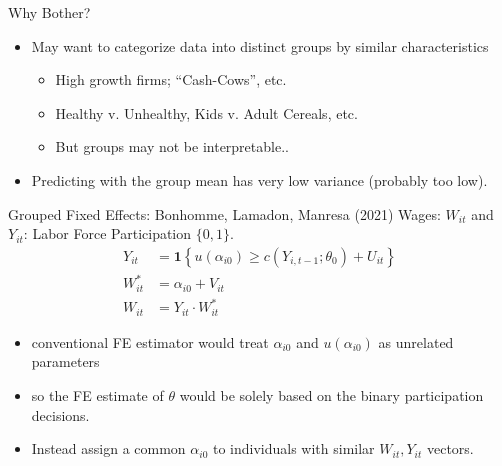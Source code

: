 \documentclass[xcolor=pdftex,dvipsnames,table,mathserif,aspectratio=169]{beamer}
\begin{document}
\begin{frame}{Why Bother?}
\begin{itemize}
\item May want to categorize data into distinct groups by similar characteristics
\begin{itemize}
\item High growth firms; ``Cash-Cows'', etc.
\item Healthy v. Unhealthy, Kids v. Adult Cereals, etc.
\item But groups may not be interpretable..
\end{itemize}
\item Predicting with the group mean has very low variance (probably too low).
\end{itemize}
\end{frame}


\begin{frame}{Grouped Fixed Effects: Bonhomme, Lamadon, Manresa (2021) }
Wages: $W_{it}$ and $Y_{it}$: Labor Force Participation $\{0,1\}$.
\begin{align*}
Y_{i t} &=\mathbf{1}\left\{u\left(\alpha_{i 0}\right) \geq c\left(Y_{i, t-1} ; \theta_{0}\right)+U_{i t}\right\} \\
W_{i t}^{*} &=\alpha_{i 0}+V_{i t} \\
W_{i t} &=Y_{i t} \cdot W_{i t}^{*}
\end{align*}
\begin{itemize}
\item conventional FE estimator would treat $\alpha_{i0}$ and $u(\alpha_{i0})$ as unrelated parameters
\item so the FE estimate of $\theta$ would be solely based on the binary participation decisions.
\item Instead assign a common $\alpha_{i0}$ to individuals with similar $W_{it},Y_{it}$ vectors.
\end{itemize}
\end{frame}
\end{document}
